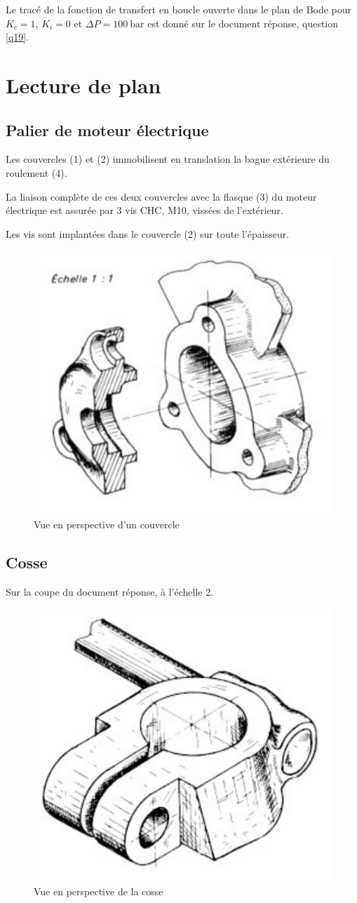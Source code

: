 Le tracé de la fonction de transfert en boucle ouverte dans le plan de Bode pour $K_c=1$, $K_i=0$ et $\Delta P=\SI{100}{\bar}$ est donné sur le document réponse, question \ref{q19}.


\newpage

\section{Lecture de plan}

\subsection{Palier de moteur électrique}

Les couvercles (1) et (2) immobilisent en translation la bague extérieure du roulement (4).

La liaison complète de ces deux couvercles avec la flasque (3) du moteur électrique est assurée par 3 vis CHC, M10, vissées de l'extérieur.

Les vis sont implantées dans le couvercle (2) sur toute l'épaisseur.

\begin{figure}[ht!]
\begin{center}
	\includegraphics[width=0.3\linewidth]{img/dessin_01_pers}
\end{center}
  \caption{Vue en perspective d'un couvercle}
\label{fig11}
\end{figure}


\subsection{Cosse}

Sur la coupe du document réponse, à l'échelle 2.

\begin{figure}[ht!]
\begin{center}
	\includegraphics[width=0.3\linewidth]{img/dessin_02_pers}
\end{center}
  \caption{Vue en perspective de la cosse}
\label{fig12}
\end{figure}

